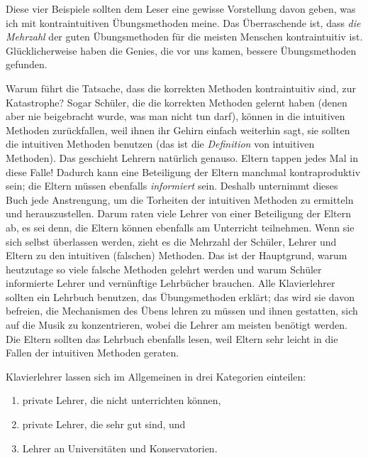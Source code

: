 Diese vier Beispiele sollten dem Leser eine gewisse Vorstellung davon geben, was ich mit kontraintuitiven Übungsmethoden meine.
 Das Überraschende ist, dass \textit{die Mehrzahl} der guten Übungsmethoden für die meisten Menschen kontraintuitiv ist.
 Glücklicherweise haben die Genies, die vor uns kamen, bessere Übungsmethoden gefunden.
 

Warum führt die Tatsache, dass die korrekten Methoden kontraintuitiv sind, zur Katastrophe?
 Sogar Schüler, die die korrekten Methoden gelernt haben (denen aber nie beigebracht wurde, was man nicht tun darf), können in die intuitiven Methoden zurückfallen, weil ihnen ihr Gehirn einfach weiterhin sagt, sie sollten die intuitiven Methoden benutzen (das ist die \textit{Definition} von intuitiven Methoden).
 Das geschieht Lehrern natürlich genauso.
 Eltern tappen jedes Mal in diese Falle!
 Dadurch kann eine Beteiligung der Eltern manchmal kontraproduktiv sein; die Eltern müssen ebenfalls \textit{informiert} sein.
 Deshalb unternimmt dieses Buch jede Anstrengung, um die Torheiten der intuitiven Methoden zu ermitteln und herauszustellen.
 Darum raten viele Lehrer von einer Beteiligung der Eltern ab, es sei denn, die Eltern können ebenfalls am Unterricht teilnehmen.
 Wenn sie sich selbst überlassen werden, zieht es die Mehrzahl der Schüler, Lehrer und Eltern zu den intuitiven (falschen) Methoden.
 Das ist der Hauptgrund, warum heutzutage so viele falsche Methoden gelehrt werden und warum Schüler informierte Lehrer und vernünftige Lehrbücher brauchen.
 Alle Klavierlehrer sollten ein Lehrbuch benutzen, das Übungsmethoden erklärt; das wird sie davon befreien, die Mechanismen des Übens lehren zu müssen und ihnen gestatten, sich auf die Musik zu konzentrieren, wobei die Lehrer am meisten benötigt werden.
 Die Eltern sollten das Lehrbuch ebenfalls lesen, weil Eltern sehr leicht in die Fallen der intuitiven Methoden geraten.
 

Klavierlehrer lassen sich im Allgemeinen in drei Kategorien einteilen:
 
\begin{enumerate}
	\item private Lehrer, die nicht unterrichten können,
	\item private Lehrer, die sehr gut sind, und
	\item Lehrer an Universitäten und Konservatorien.
\end{enumerate}

